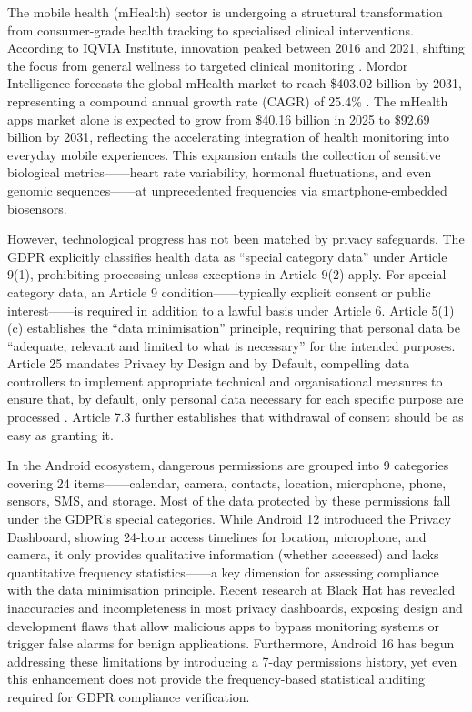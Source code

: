 The mobile health (mHealth) sector is undergoing a structural transformation from consumer-grade health tracking to specialised clinical interventions. According to IQVIA Institute, innovation peaked between 2016 and 2021, shifting the focus from general wellness to targeted clinical monitoring \cite{iqvia2021}. Mordor Intelligence forecasts the global mHealth market to reach \$403.02 billion by 2031, representing a compound annual growth rate (CAGR) of 25.4\% \cite{mordor2023}. The mHealth apps market alone is expected to grow from \$40.16 billion in 2025 to \$92.69 billion by 2031, reflecting the accelerating integration of health monitoring into everyday mobile experiences. This expansion entails the collection of sensitive biological metrics——heart rate variability, hormonal fluctuations, and even genomic sequences——at unprecedented frequencies via smartphone-embedded biosensors.

However, technological progress has not been matched by privacy safeguards. The GDPR explicitly classifies health data as ``special category data'' under Article 9(1), prohibiting processing unless exceptions in Article 9(2) apply. For special category data, an Article 9 condition——typically explicit consent or public interest——is required in addition to a lawful basis under Article 6. Article 5(1)(c) establishes the ``data minimisation'' principle, requiring that personal data be ``adequate, relevant and limited to what is necessary'' for the intended purposes. Article 25 mandates Privacy by Design and by Default, compelling data controllers to implement appropriate technical and organisational measures to ensure that, by default, only personal data necessary for each specific purpose are processed \cite{eurlex2016}. Article 7.3 further establishes that withdrawal of consent should be as easy as granting it.

In the Android ecosystem, dangerous permissions are grouped into 9 categories covering 24 items——calendar, camera, contacts, location, microphone, phone, sensors, SMS, and storage. Most of the data protected by these permissions fall under the GDPR's special categories. While Android 12 introduced the Privacy Dashboard, showing 24-hour access timelines for location, microphone, and camera, it only provides qualitative information (whether accessed) and lacks quantitative frequency statistics——a key dimension for assessing compliance with the data minimisation principle. Recent research at Black Hat has revealed inaccuracies and incompleteness in most privacy dashboards, exposing design and development flaws that allow malicious apps to bypass monitoring systems or trigger false alarms for benign applications. Furthermore, Android 16 has begun addressing these limitations by introducing a 7-day permissions history, yet even this enhancement does not provide the frequency-based statistical auditing required for GDPR compliance verification.

